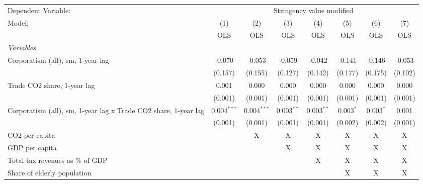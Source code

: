 
\begingroup
\centering
\begin{tabular}{lccccccc}
   \toprule
   Dependent Variable: & \multicolumn{7}{c}{Stringency value modified}\\
   Model:                                                          & (1)           & (2)           & (3)          & (4)          & (5)         & (6)         & (7)\\  
                                                                   &  OLS          & OLS           & OLS          & OLS          & OLS         & OLS         & OLS\\  
   \midrule
   \emph{Variables}\\
   Corporatism (all), sm, 1-year lag                               & -0.070        & -0.053        & -0.059       & -0.042       & -0.141      & -0.146      & -0.053\\   
                                                                   & (0.157)       & (0.155)       & (0.127)      & (0.142)      & (0.177)     & (0.175)     & (0.102)\\   
   Trade CO2 share, 1-year lag                                     & 0.001         & 0.000         & 0.000        & 0.000        & 0.000       & 0.000       & 0.000\\   
                                                                   & (0.001)       & (0.001)       & (0.001)      & (0.001)      & (0.001)     & (0.001)     & (0.001)\\   
   Corporatism (all), sm, 1-year lag x Trade CO2 share, 1-year lag & 0.004$^{***}$ & 0.004$^{***}$ & 0.003$^{**}$ & 0.003$^{**}$ & 0.003$^{*}$ & 0.003$^{*}$ & 0.001\\   
                                                                   & (0.001)       & (0.001)       & (0.001)      & (0.001)      & (0.002)     & (0.002)     & (0.001)\\   
   CO2 per capita                                                  &               & X             & X            & X            & X           & X           & X\\  
   GDP per capita                                                  &               &               & X            & X            & X           & X           & X\\  
   Total tax revenues as \% of GDP                                 &               &               &              & X            & X           & X           & X\\  
   Share of elderly population                                     &               &               &              &              & X           & X           & X\\  

\end{tabular}
